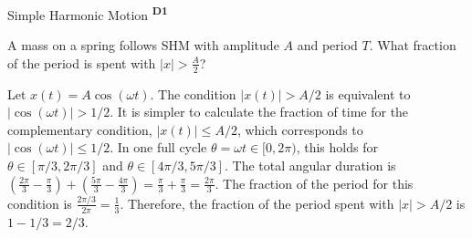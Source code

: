 ﻿\documentclass[12pt,a4paper]{article}
\providecommand{\KPProblems}{}
\newcommand{\DOne}{\texorpdfstring{\textsuperscript{\textbf{D1}}}{ D1}}
\begin{document}
\begin{KnowledgePoint}{Simple Harmonic Motion \DOne}
  \KPProblems
  \begin{cheatproblem}
  A mass on a spring follows SHM with amplitude $A$ and period $T$. What fraction of the period is spent with $|x|>\tfrac{A}{2}$?
  \begin{solutionbox}
  Let $x(t)=A\cos(\omega t)$. The condition $|x(t)|>A/2$ is equivalent to $|\cos(\omega t)|>1/2$. It is simpler to calculate the fraction of time for the complementary condition, $|x(t)|\le A/2$, which corresponds to $|\cos(\omega t)|\le 1/2$.
  In one full cycle $\theta=\omega t \in [0, 2\pi)$, this holds for $\theta \in [\pi/3, 2\pi/3]$ and $\theta \in [4\pi/3, 5\pi/3]$. The total angular duration is $(\frac{2\pi}{3}-\frac{\pi}{3}) + (\frac{5\pi}{3}-\frac{4\pi}{3}) = \frac{\pi}{3}+\frac{\pi}{3}=\frac{2\pi}{3}$.
  The fraction of the period for this condition is $\frac{2\pi/3}{2\pi}=\frac{1}{3}$.
  Therefore, the fraction of the period spent with $|x|>A/2$ is $1 - 1/3 = 2/3$.
  \end{solutionbox}
  \end{cheatproblem}
\end{KnowledgePoint}
\end{document}
